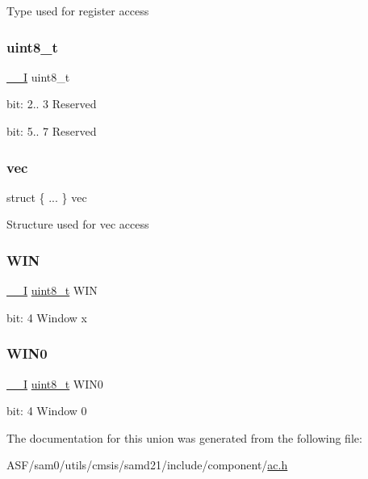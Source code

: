 Type used for register access \mbox{\label{union_a_c___i_n_t_f_l_a_g___type_a5b4208c6f4c4a4290c4f2804d1eb1d5b}} 
\subsubsection{\texorpdfstring{uint8\_t}{uint8\_t}}
{\footnotesize\ttfamily \mbox{\hyperlink{core__cm0plus_8h_af63697ed9952cc71e1225efe205f6cd3}{\+\_\+\+\_\+I}} uint8\+\_\+t}

bit\+: 2.. 3 Reserved

bit\+: 5.. 7 Reserved \mbox{\label{union_a_c___i_n_t_f_l_a_g___type_a70d7fd617d194510b1d0ee4c75153e83}} 
\subsubsection{\texorpdfstring{vec}{vec}}
{\footnotesize\ttfamily struct \{ ... \}   vec}

Structure used for vec access \mbox{\label{union_a_c___i_n_t_f_l_a_g___type_a784b25f1a6a9f0d9f11bcf938ce05210}} 
\subsubsection{\texorpdfstring{WIN}{WIN}}
{\footnotesize\ttfamily \mbox{\hyperlink{core__cm0plus_8h_af63697ed9952cc71e1225efe205f6cd3}{\+\_\+\+\_\+I}} \mbox{\hyperlink{union_a_c___i_n_t_f_l_a_g___type_a5b4208c6f4c4a4290c4f2804d1eb1d5b}{uint8\+\_\+t}} W\+IN}

bit\+: 4 Window x \mbox{\label{union_a_c___i_n_t_f_l_a_g___type_a856111d8065c616bc370ee817fc53491}} 
\subsubsection{\texorpdfstring{WIN0}{WIN0}}
{\footnotesize\ttfamily \mbox{\hyperlink{core__cm0plus_8h_af63697ed9952cc71e1225efe205f6cd3}{\+\_\+\+\_\+I}} \mbox{\hyperlink{union_a_c___i_n_t_f_l_a_g___type_a5b4208c6f4c4a4290c4f2804d1eb1d5b}{uint8\+\_\+t}} W\+I\+N0}

bit\+: 4 Window 0 

The documentation for this union was generated from the following file\+:\begin{DoxyCompactItemize}
\item 
A\+S\+F/sam0/utils/cmsis/samd21/include/component/\mbox{\hyperlink{component_2ac_8h}{ac.\+h}}\end{DoxyCompactItemize}

